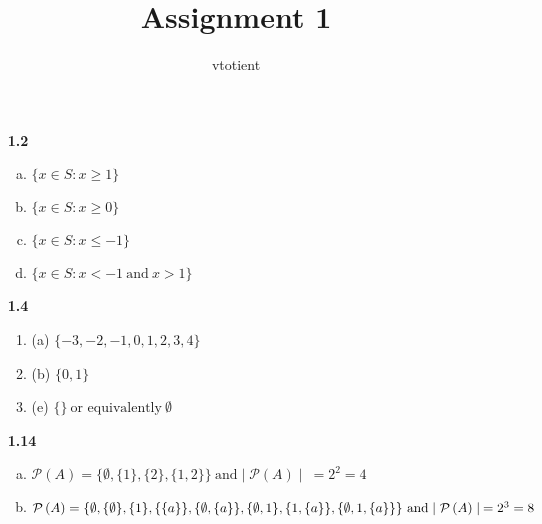 \documentclass[12pt]{article}
\newcommand{\pow}[1]{ \mathcal{P}\left(#1\right) }
\begin{document}
 
 
 
\title{Assignment 1}%
\author{vtotient\\}
 
\maketitle
 
\begin{itemize}
    
    \item[\bf{1.2}]
    
        \begin{enumerate}[(a)]
            \item $\{x\in S: x\geq1\}$
            \item $\{x\in S: x\geq0\}$
            \item $\{x\in S: x\leq-1\}$
            \item $\{x\in S: x < -1 \ \text{and} \ x > 1\}$
        \end{enumerate}
    
    \item[\bf{1.4}]
    
        \begin{enumerate}[]
            \item (a) $\{-3,-2,-1,0,1,2,3,4\}$
            \item (b) $\{0,1\}$
            \item (e) $\{\} \ \text{or equivalently} \ \emptyset $
        \end{enumerate}
    
    \item[\bf{1.14}]
    
        \begin{enumerate}[(a)]
            \item $ \pow{A}= \{ \emptyset,\{1\}, \{2\}, \{1,2\}\} \ \text{and} \mid \pow{A} \mid \: = 2^2=4$
            \item $ \pow{A}= \{\emptyset,\{\emptyset\}, \{1\}, \{\{a\}\}, \{\emptyset,\{a\}\}, \{\emptyset, 1\}, \{1,\{a\}\}, \{\emptyset, 1, \{a\}\}\} \ \text{and} \\
            \mid \pow{A} \mid \: =2^3 = 8$
        \end{enumerate}
    

\end{itemize}
\end{document}
